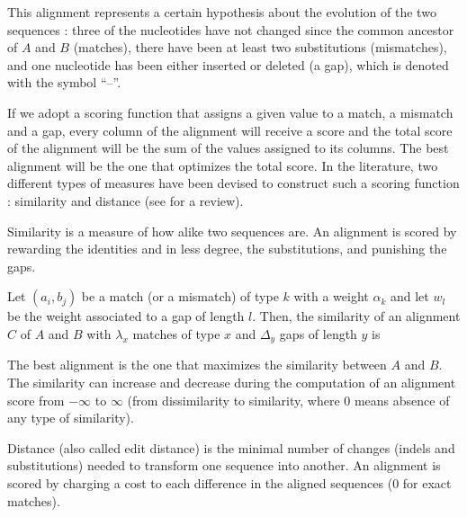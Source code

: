 This alignment represents a certain hypothesis about the evolution of the two sequences 
\citep{waterman:1990a}: three of the nucleotides have not changed since the common ancestor of $A$ 
and $B$ (matches), there have been at least two substitutions (mismatches), and one nucleotide has 
been either inserted or deleted (a gap), which is denoted with the symbol ``--''.

If we adopt a scoring function that assigns a given value to a match, a mismatch and a gap, every 
column of the alignment will receive a score and the total score of the alignment will be the sum
of the values assigned to its columns. The best alignment will be the one that optimizes the total 
score. In the literature, two different types of measures have been devised to construct such a scoring 
function : similarity and distance (see \citet{smith:1981a} for a review).

 
Similarity is a measure of how alike two sequences are. An alignment is scored by rewarding the
identities and in less degree, the substitutions, and punishing the gaps. 

Let $(a_i,b_j)$ be a match (or a mismatch) of type $k$ with a weight $\alpha_k$ and let $w_l$ 
be the weight associated to a gap of length $l$. Then, the similarity of an alignment $C$ of $A$ and
$B$ with $\lambda_x$ matches of type $x$ and $\Delta_y$ gaps of length $y$ is

\begin{center}
\end{center}

The best alignment is the one that maximizes the similarity between $A$ and $B$. The similarity 
can increase and decrease during the computation of an alignment score from $-\infty$ to $\infty$ 
(from dissimilarity to similarity, where $0$ means absence of any type of similarity).

 
Distance (also called edit distance) is the minimal number of changes (indels and substitutions) 
needed to transform one sequence into another. An alignment is scored by charging a cost to each 
difference in the aligned sequences ($0$ for exact matches). 

